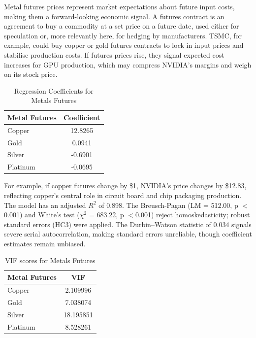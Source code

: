 \documentclass[12pt]{article}
\begin{document}
    Metal futures prices represent market expectations about future input costs, making them a forward-looking economic signal. A futures contract is an agreement to buy a commodity at a set price on a future date, used either for speculation or, more relevantly here, for hedging by manufacturers. TSMC, for example, could buy copper or gold futures contracts to lock in input prices and stabilise production costs. If futures prices rise, they signal expected cost increases for GPU production, which may compress NVIDIA's margins and weigh on its stock price.
    
    \begin{table}[h]
    \centering
    \begin{tabular}{lc}
    \hline
    \textbf{Metal Futures} & \textbf{Coefficient} \\
    \hline
    Copper & 12.8265 \\
    Gold & 0.0941 \\
    Silver  & -0.6901 \\
    Platinum & -0.0695 \\
    \hline
    \end{tabular}
    \caption{Regression Coefficients for Metals Futures}
    \end{table}
    
    For example, if copper futures change by \$1, NVIDIA's price changes by \$12.83, reflecting copper's central role in circuit board and chip packaging production. The model has an adjusted $R^2$ of 0.898. The Breusch-Pagan (LM = 512.00, p $<$ 0.001) and White's test ($\chi^2$ = 683.22, p $<$0.001) reject homoskedasticity; robust standard errors (HC3) were applied. The Durbin--Watson statistic of 0.034 signals severe serial autocorrelation, making standard errors unreliable, though coefficient estimates remain unbiased.
    
    \begin{table}[h]
    \centering
    \begin{tabular}{lc}
    \hline
    \textbf{Metal Futures} & \textbf{VIF} \\
    \hline
    Copper & 2.109996 \\
    Gold & 7.038074 \\
    Silver  & 18.195851 \\
    Platinum & 8.528261 \\
    \hline
    \end{tabular}
    \caption{VIF scores for Metals Futures}
    \end{table}
    
\end{document}
